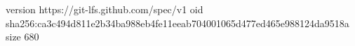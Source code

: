 version https://git-lfs.github.com/spec/v1
oid sha256:ca3c494d811e2b34ba988eb4fe11eeab704001065d477ed465e988124da9518a
size 680
